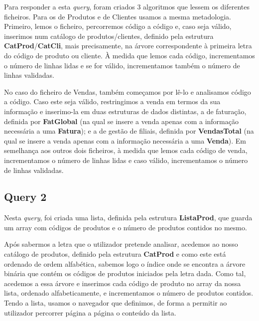 \documentclass{article}
\begin{document}
\par\noindent\hspace{0.52cm}Para responder a esta \textit{query}, foram criados 3 algoritmos que lessem os diferentes ficheiros.
Para os de Produtos e de Clientes usamos a mesma metadologia. Primeiro, lemos o ficheiro, percorremos código a código e, caso seja válido, inserimos num catálogo de produtos/clientes, definido pela estrutura \textbf{CatProd}/\textbf{CatCli}, mais precisamente, na árvore correspondente à primeira letra do código de produto ou cliente. À medida que lemos cada código, incrementamos o número de linhas lidas e se for válido, incrementamos também o número de linhas validadas.
\par No caso do ficheiro de Vendas, também começamos por lê-lo e analisamos código a código. Caso este seja válido, restringimos a venda em termos da sua informação e inserimo-la em duas estruturas de dados distintas, a de faturação, definida por \textbf{FatGlobal} (na qual se insere a venda apenas com a informação necessária a uma \textbf{Fatura}); e a de gestão de filiais, definida por \textbf{VendasTotal} (na qual se insere a venda apenas com a informação necessária a uma \textbf{Venda}). Em semelhança aos outros dois ficheiros, à medida que lemos cada código de venda, incrementamos o número de linhas lidas e caso válido, incrementamos o número de linhas validadas.

\subsection{Query 2}

\noindent{}
\vspace{1cm}

\par\noindent\hspace{0.52cm}Nesta \textit{query}, foi criada uma lista, definida pela estrutura \textbf{ListaProd}, que guarda um array com códigos de produtos e o número de produtos contidos no mesmo.
\par Após sabermos a letra que o utilizador pretende analisar, acedemos ao nosso catálogo de produtos, definido pela estrutura \textbf{CatProd} e como este está ordenado de ordem alfabética, sabemos logo o índice onde se encontra a árvore binária que contém os códigos de produtos iniciados pela letra dada. Como tal, acedemos a essa árvore e inserimos cada código de produto no array da nossa lista, ordenado alfabeticamente, e incrementamos o número de produtos contidos. Tendo a lista, usamos o navegador que definimos, de forma a permitir ao utilizador percorrer página a página o conteúdo da lista.
\end{document}
